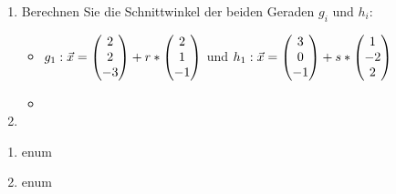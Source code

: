 






\begin{enumerate}
	\item Berechnen Sie die Schnittwinkel der beiden Geraden $g_i$ und $h_i$:
	\begin{itemize}
		\item $g_1: \vec x = \begin{pmatrix} 2\\2\\-3 \end{pmatrix} + r*\begin{pmatrix} 2\\1\\-1 \end{pmatrix}$ und $h_1: \vec x = \begin{pmatrix} 3\\0\\-1 \end{pmatrix} + s* \begin{pmatrix} 1\\-2\\2 \end{pmatrix}$
		\item
	\end{itemize}
	\item
\end{enumerate}

\begin{enumerate}
	\item enum
	\item	enum
\end{enumerate}







